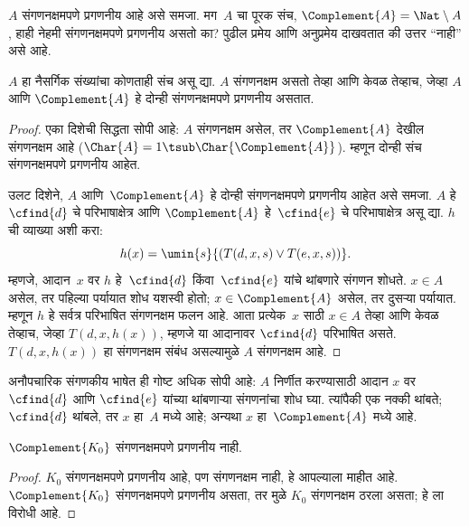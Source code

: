 \documentclass[../../../include/open-logic-section]{subfiles}
\begin{document}

$A$ संगणनक्षमपणे प्रगणनीय आहे असे समजा. मग~$A$ चा पूरक संच,
$\Complement{A} = \Nat \setminus A$, हाही नेहमी संगणनक्षमपणे
प्रगणनीय असतो का? पुढील प्रमेय आणि अनुप्रमेय दाखवतात की उत्तर
``नाही'' असे आहे.

\begin{thm}
$A$ हा नैसर्गिक संख्यांचा कोणताही संच असू द्या. $A$ संगणनक्षम असतो
तेव्हा आणि केवळ तेव्हाच, जेव्हा $A$ आणि $\Complement{A}$ हे दोन्ही
संगणनक्षमपणे प्रगणनीय असतात.
\end{thm}

\begin{proof}
एका दिशेची सिद्धता सोपी आहे: $A$ संगणनक्षम असेल, तर
$\Complement{A}$ देखील संगणनक्षम आहे ($\Char{A} = 1 \tsub
\Char{\Complement{A}}$). म्हणून दोन्ही संच संगणनक्षमपणे प्रगणनीय आहेत.

उलट दिशेने, $A$ आणि~$\Complement{A}$ हे दोन्ही संगणनक्षमपणे
प्रगणनीय आहेत असे समजा. $A$ हे~$\cfind{d}$ चे परिभाषाक्षेत्र
आणि $\Complement{A}$ हे~$\cfind{e}$ चे परिभाषाक्षेत्र असू द्या.
$h$ ची व्याख्या अशी करा:
\[
h(x) = \umin{s}{(T(d,x,s) \lor T(e,x,s))}.
\]
म्हणजे, आदान~$x$ वर $h$ हे~$\cfind{d}$ किंवा~$\cfind{e}$
यांचे थांबणारे संगणन शोधते. $x \in A$ असेल, तर पहिल्या
पर्यायात शोध यशस्वी होतो; $x \in
\Complement{A}$ असेल, तर दुसऱ्या पर्यायात. म्हणून $h$
हे सर्वत्र परिभाषित संगणनक्षम फलन आहे. आता प्रत्येक~$x$
साठी $x \in A$ तेव्हा आणि केवळ तेव्हाच, जेव्हा $T(d, x, h(x))$, म्हणजे
या आदानावर $\cfind{d}$ परिभाषित असते. $T(d, x, h(x))$
हा संगणनक्षम संबंध असल्यामुळे $A$ संगणनक्षम आहे.
\end{proof}

\begin{explain}
अनौपचारिक संगणकीय भाषेत ही गोष्ट अधिक सोपी आहे: $A$
निर्णीत करण्यासाठी आदान $x$ वर $\cfind{d}$ आणि $\cfind{e}$
यांच्या थांबणाऱ्या संगणनांचा शोध घ्या. त्यांपैकी एक नक्की थांबते;
$\cfind{d}$ थांबले, तर $x$ हा~$A$ मध्ये आहे; अन्यथा $x$
हा~$\Complement{A}$ मध्ये आहे.
\end{explain}

\begin{cor}
$\Complement{K_0}$ संगणनक्षमपणे प्रगणनीय नाही.
\end{cor}

\begin{proof}
$K_0$ संगणनक्षमपणे प्रगणनीय आहे, पण संगणनक्षम नाही, हे
आपल्याला माहीत आहे. $\Complement{K_0}$ संगणनक्षमपणे प्रगणनीय
असता, तर  मुळे $K_0$ संगणनक्षम ठरला असता;
हे  ला विरोधी आहे.
\end{proof}
\end{document}
